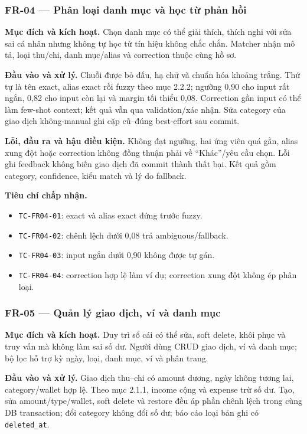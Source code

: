 \subsubsection{FR-04 --- Phân loại danh mục và học từ phản hồi}

\textbf{Mục đích và kích hoạt.} Chọn danh mục có thể giải thích, thích nghi với sửa sai cá nhân nhưng không tự học từ tín hiệu không chắc chắn. Matcher nhận mô tả, loại thu/chi, danh mục/alias và correction thuộc cùng hồ sơ.

\textbf{Đầu vào và xử lý.} Chuỗi được bỏ dấu, hạ chữ và chuẩn hóa khoảng trắng. Thứ tự là tên exact, alias exact rồi fuzzy theo mục 2.2.2; ngưỡng 0,90 cho input rất ngắn, 0,82 cho input còn lại và margin tối thiểu 0,08. Correction gần input có thể làm few-shot context; kết quả vẫn qua validation/xác nhận. Sửa category của giao dịch không-manual ghi cặp cũ--đúng best-effort sau commit.

\textbf{Lỗi, đầu ra và hậu điều kiện.} Không đạt ngưỡng, hai ứng viên quá gần, alias xung đột hoặc correction không đồng thuận phải về ``Khác''/yêu cầu chọn. Lỗi ghi feedback không biến giao dịch đã commit thành thất bại. Kết quả gồm category, confidence, kiểu match và lý do fallback.

\textbf{Tiêu chí chấp nhận.}
\begin{itemize}
  \item \texttt{TC-FR04-01}: exact và alias exact đứng trước fuzzy.
  \item \texttt{TC-FR04-02}: chênh lệch dưới 0,08 trả ambiguous/fallback.
  \item \texttt{TC-FR04-03}: input ngắn dưới 0,90 không được tự gán.
  \item \texttt{TC-FR04-04}: correction hợp lệ làm ví dụ; correction xung đột không ép phân loại.
\end{itemize}

\subsubsection{FR-05 --- Quản lý giao dịch, ví và danh mục}

\textbf{Mục đích và kích hoạt.} Duy trì sổ cái có thể sửa, soft delete, khôi phục và truy vấn mà không làm sai số dư. Người dùng CRUD giao dịch, ví và danh mục; bộ lọc hỗ trợ kỳ ngày, loại, danh mục, ví và phân trang.

\textbf{Đầu vào và xử lý.} Giao dịch thu--chi có amount dương, ngày không tương lai, category/wallet hợp lệ. Theo mục 2.1.1, income cộng và expense trừ số dư. Tạo, sửa amount/type/wallet, soft delete và restore đều áp phần chênh lệch trong cùng DB transaction; đổi category không đổi số dư; báo cáo loại bản ghi có \texttt{deleted\_at}.

